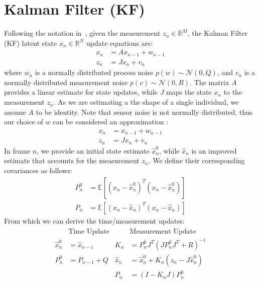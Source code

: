 \appendix
\section{Kalman Filter (KF)} 
\label{app:kalman}
Following the notation in~\cite{welch1995introduction}, given the measurement $z_n \in \mathbb{R}^M$, the Kalman Filter (KF) latent state $x_n \in \mathbb{R}^N$ update equations are:
% 
\begin{align}
x_n &= A x_{n - 1} +  w_{n - 1} \\
z_n &= J x_n + v_n
\end{align}
% 
where $w_n$ is a normally distributed process noise $p(w) \sim \mathcal{N}(0, Q)$, and $v_n$ is a normally distributed measurement noise $p(v) \sim \mathcal{N}(0, R)$. The matrix $A$ provides a linear estimate for state updates, while $J$ maps the state $x_n$ to the measurement $z_n$. As we are estimating a the shape of a single individual, we assume $A$ to be identity. Note that sensor noise is not normally distributed, thus our choice of $w$ can be considered an approximation :
% 
\begin{align}
x_n &= x_{n - 1} + w_{n - 1} \\
z_n &= J x_n + v_n
\end{align}
% 
In frame $n$, we provide an initial state estimate $\hat{x}_n^0$, while $\hat{x}_n$ is an improved estimate that accounts for the measurement $z_n$. We define their corresponding covariances as follows: 
% 
\begin{align}
P_n^0 &= \mathbb{E}[(x_n - \hat{x}_n^0)^T(x_n - \hat{x}_n^0)]\\
P_n   &= \mathbb{E}[(x_n - \hat{x}_n)^T(x_n - \hat{x}_n)]
\end{align}
% 
From which we can derive the time/measurement updates:
% 
\begin{gather}
\begin{aligned}
&\text{Time Update}                 &       &\text{Measurement Update} \\
\hat{x}_n^0 &= \hat{x}_{n - 1}      &       K_n &= P_n^0 J^T (J P_n^0 J^T + R)^{-1}\\
P_n^0 &= P_{n - 1} + Q              &       \hat{x}_n &= \hat{x}_n^0 + K_n (z_n - J \hat{x}_n^0) \\
&                                   &       P_n &= (I - K_n J) P_n^0 \\
\end{aligned}
\label{eq:kalman}
\end{gather}



